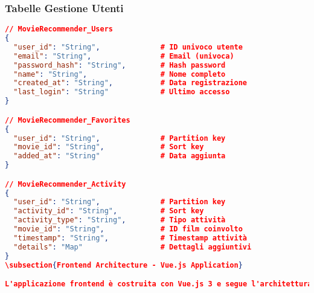 \documentclass[11pt,a4paper]{article}
\begin{document}
\subsubsection{Tabelle Gestione Utenti}
\begin{lstlisting}[language=JSON, caption=Schema Tabelle Utente]
// MovieRecommender_Users
{
  "user_id": "String",              # ID univoco utente
  "email": "String",                # Email (univoca)
  "password_hash": "String",        # Hash password
  "name": "String",                 # Nome completo
  "created_at": "String",           # Data registrazione
  "last_login": "String"            # Ultimo accesso
}

// MovieRecommender_Favorites
{
  "user_id": "String",              # Partition key
  "movie_id": "String",             # Sort key
  "added_at": "String"              # Data aggiunta
}

// MovieRecommender_Activity
{
  "user_id": "String",              # Partition key
  "activity_id": "String",          # Sort key
  "activity_type": "String",        # Tipo attività
  "movie_id": "String",             # ID film coinvolto
  "timestamp": "String",            # Timestamp attività
  "details": "Map"                  # Dettagli aggiuntivi
}
\subsection{Frontend Architecture - Vue.js Application}

L'applicazione frontend è costruita con Vue.js 3 e segue l'architettura Component-Based con state management centralizzato.


\end{lstlisting}
\end{document}
